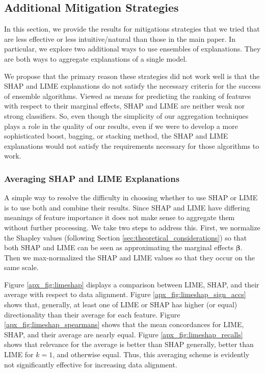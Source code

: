 \documentclass[mnsc,blindrev]{informs3}
\begin{document}
    
    
    
  
    \subsection{Additional Mitigation Strategies}
        \label{apx_sec:additional_mitigations}
        In this section, we provide the results for mitigations strategies that we tried that are less effective or less intuitive/natural than those in the main paper. In particular, we explore two additional ways to use ensembles of explanations. They are both ways to aggregate explanations of a single model. 
        
        We propose that the primary reason these strategies did not work well is that the SHAP and LIME explanations do not satisfy the necessary criteria for the success of ensemble algorithms. Viewed as means for predicting the ranking of features with respect to their marginal effects, SHAP and LIME are neither weak nor strong classifiers. So, even though the simplicity of our aggregation techniques plays a role in the quality of our results, even if we were to develop a more sophisticated boost, bagging, or stacking method, the SHAP and LIME explanations would not satisfy the requirements necessary for those algorithms to work. %

            \subsubsection{Averaging SHAP and LIME Explanations}
            A simple way to resolve the difficulty in choosing whether to use SHAP or LIME is to use both and combine their results. Since SHAP and LIME have differing meanings of feature importance it does not make sense to aggregate them without further processing. We take two steps to address this. First, we normalize the Shapley values (following Section \ref{sec:theoretical_considerations}) so that both SHAP and LIME can be seen as approximating the marginal effects $\boldsymbol{\beta}$. Then we max-normalized the SHAP and LIME values so that they occur on the same scale. 

            Figure \ref{apx_fig:limeshap} displays a comparison between LIME, SHAP, and their average with respect to data alignment. Figure \ref{apx_fig:limeshap_sign_accs} shows that, generally, at least one of LIME or SHAP has higher (or equal) directionality than their average for each feature. Figure \ref{apx_fig:limeshap_spearmans} shows that the mean concordances for LIME, SHAP, and their average are nearly equal. Figure \ref{apx_fig:limeshap_recalls} shows that relevance for the average is better than SHAP generally, better than LIME for $k=1$, and otherwise equal. Thus, this averaging scheme is evidently not significantly effective for increasing data alignment. 
\end{document}
